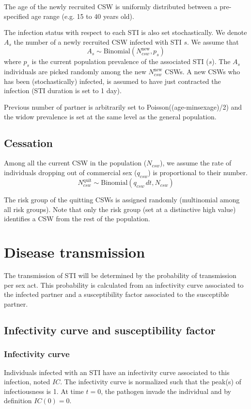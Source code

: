 \documentclass[11pt, onecolumn]{article}
\begin{document}
The age of the newly recruited CSW is uniformly distributed between a pre-specified age range (e.g. 15 to 40 years old).

The infection status with respect to each STI is also set stochastically. We denote $A_s$ the number of a newly recruited CSW infected with STI $s$. We assume that
$$A_s \sim \text{Binomial}(N_{csw}^{\mathrm{new}},p_s)$$
where $p_s$ is the current population prevalence of the associated STI ($s$). The $A_s$ individuals are picked randomly among the new $N_{csw}^{\mathrm{new}}$ CSWs.
A new CSWs who has been (stochastically) infected, is assumed to have just contracted the infection (STI duration is set to 1 day).

Previous number of partner is arbitrarily set to Poisson((age-minsexage)/2) and the widow prevalence is set at the same level as the general population.

\subsection{Cessation}

Among all the current CSW in the population ($N_{csw}$), we assume the rate of individuals dropping out of commercial sex ($q_{csw}$) is proportional to their number.
$$N_{csw}^{\mathrm{quit}} \sim \text{Binomial}\left(q_{csw}\,dt,N_{csw}\right)$$

The risk group of the quitting CSWs is assigned randomly (multinomial among all risk groups). Note that only the risk group (set at a distinctive high value) identifies a CSW from the rest of the population.




\section{Disease transmission}

The transmission of STI will be determined by the probability of transmission per sex act. This probability is calculated from an infectivity curve associated to the infected partner and a susceptibility factor associated to the susceptible partner.

\subsection{Infectivity curve and susceptibility factor}

\subsubsection*{Infectivity curve}
Individuals infected with an STI have an infectivity curve associated to this infection, noted $IC$. The infectivity curve is normalized such that the peak(s) of infectiousness is 1. At time $t=0$, the pathogen invade the individual and by definition $IC(0)=0$.
\end{document}
